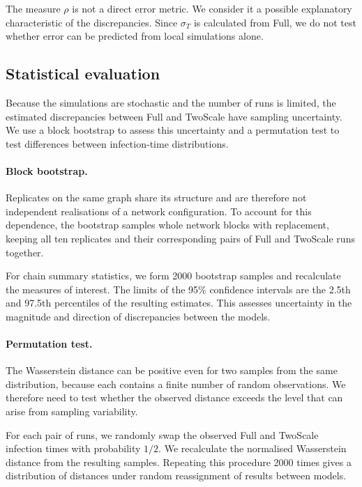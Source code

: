 \documentclass{ieeeaccess}
\newcommand{\Full}{\textup{Full}}
\newcommand{\TS}{\textup{TwoScale}}
\begin{document}
The measure $\rho$ is not a direct error metric. We consider it a possible explanatory characteristic of the discrepancies. Since $\sigma_T$ is calculated from \Full{}, we do not test whether error can be predicted from local simulations alone.

\subsection{Statistical evaluation}

Because the simulations are stochastic and the number of runs is limited, the estimated discrepancies between \Full{} and \TS{} have sampling uncertainty. We use a block bootstrap to assess this uncertainty and a permutation test to test differences between infection-time distributions.

\paragraph{Block bootstrap.}
Replicates on the same graph share its structure and are therefore not independent realisations of a network configuration. To account for this dependence, the bootstrap samples whole network blocks with replacement, keeping all ten replicates and their corresponding pairs of \Full{} and \TS{} runs together.

For chain summary statistics, we form 2000 bootstrap samples and recalculate the measures of interest. The limits of the 95\% confidence intervals are the 2.5th and 97.5th percentiles of the resulting estimates. This assesses uncertainty in the magnitude and direction of discrepancies between the models.

\paragraph{Permutation test.}
The Wasserstein distance can be positive even for two samples from the same distribution, because each contains a finite number of random observations. We therefore need to test whether the observed distance exceeds the level that can arise from sampling variability.

For each pair of runs, we randomly swap the observed \Full{} and \TS{} infection times with probability $1/2$. We recalculate the normalised Wasserstein distance from the resulting samples. Repeating this procedure 2000 times gives a distribution of distances under random reassignment of results between models.
\end{document}

